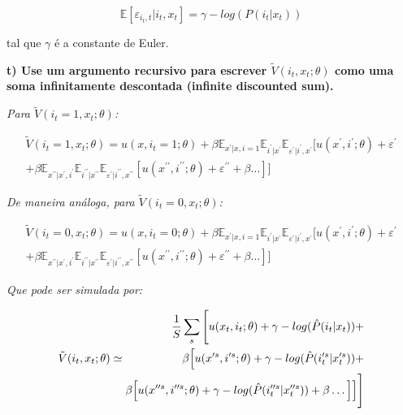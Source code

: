 \documentclass[12pt,a4paper]{article}
\begin{document}
\[
\mathbb{E}[\varepsilon_{i_{t},t}|i_t,x_t] = \gamma - log(P(i_t|x_t))
\]

tal que \(\gamma\) é a constante de Euler.

\textbf{t) Use um argumento recursivo para escrever
\(\tilde{V}(i_t,x_t;\theta)\) como uma soma infinitamente descontada
(infinite discounted sum).}

\emph{Para \(\tilde{V}(i_t=1,x_t;\theta)\):}

\[
\begin{aligned}
\tilde{V}(i_t=1,x_t;\theta)=u(x,i_t=1;\theta)+\beta\mathbb{E}_{x^\prime|x,i=1}\mathbb{E}_{i^\prime|x^\prime}\mathbb{E}_{\varepsilon^\prime|i^\prime,x^\prime}[u(x^\prime,i^\prime;\theta)+\varepsilon^\prime \\
+\beta\mathbb{E}_{x^{\prime \prime}|x^\prime,i^\prime}\mathbb{E}_{i^{\prime \prime}|x^{\prime \prime}}\mathbb{E}_{\varepsilon^\prime|i^{\prime \prime},x^{\prime \prime}}[u(x^{\prime \prime},i^{\prime \prime};\theta)+\varepsilon^{\prime \prime} + \beta \dots ]]
\end{aligned}
\]

\emph{De maneira análoga, para \(\tilde{V}(i_t=0,x_t;\theta)\):}

\[
\begin{aligned}
\tilde{V}(i_t=0,x_t;\theta)=u(x,i_t=0;\theta)+\beta\mathbb{E}_{x^\prime|x,i=1}\mathbb{E}_{i^\prime|x^\prime}\mathbb{E}_{\varepsilon^\prime|i^\prime,x^\prime}[u(x^\prime,i^\prime;\theta)+\varepsilon^\prime \\
+\beta\mathbb{E}_{x^{\prime \prime}|x^\prime,i^\prime}\mathbb{E}_{i^{\prime \prime}|x^{\prime \prime}}\mathbb{E}_{\varepsilon^\prime|i^{\prime \prime},x^{\prime \prime}}[u(x^{\prime \prime},i^{\prime \prime};\theta)+\varepsilon^{\prime \prime} + \beta \dots ]]
\end{aligned}
\]

\emph{Que pode ser simulada por:}

\[
\tilde{V}(i_t,x_t;\theta) \simeq \\
\begin{aligned}
\frac{1}{S} \sum_s \Bigg [u(x_t,i_t;\theta)+\gamma-log(\hat{P}(i_t|x_t)) + \\
\beta \Big [u(x^{\prime s},i^{\prime s};\theta) + \gamma - log(\hat{P}(i_t^{\prime s}|x_t^{\prime s})) + \\
\beta \Big [u(x^{\prime \prime s},i^{\prime \prime s};\theta) + \gamma - log(\hat{P}(i_t^{\prime \prime s}|x_t^{\prime \prime s})) + \beta \dots \Big ] \Big ] \Bigg ] 
\end{aligned}
\]
\end{document}
